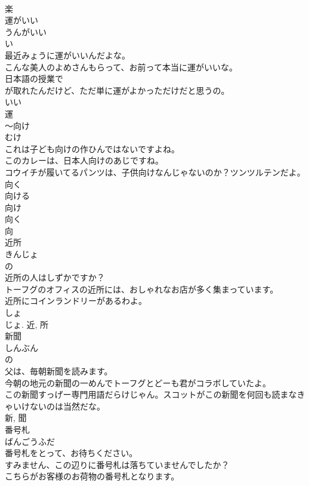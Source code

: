 \documentclass[8pt]{extreport}
\begin{document}
\begin{CJK}{UTF8}{min}
\\	楽	
\\	運がいい	
\\	うんがいい	
\\	い 
\\	最近みょうに運がいいんだよな。	
\\	こんな美人のよめさんもらって、お前って本当に運がいいな。	
\\	日本語の授業で
\\	が取れたんだけど、ただ単に運がよかっただけだと思うの。	
\\	いい 
\\	運	
\\	〜向け	
\\	むけ	
\\	これは子ども向けの作ひんではないですよね。	
\\	このカレーは、日本人向けのあじですね。	
\\	コウイチが履いてるパンツは、子供向けなんじゃないのか？ツンツルテンだよ。	
\\	向く 
\\	向ける 
\\	向け 
\\	向く 
\\	向	
\\	近所	
\\	きんじょ	
\\	の 
\\	近所の人はしずかですか？	
\\	トーフグのオフィスの近所には、おしゃれなお店が多く集まっています。	
\\	近所にコインランドリーがあるわよ。	
\\	しょ 
\\	じょ.	近, 所	
\\	新聞	
\\	しんぶん	
\\	の 
\\	父は、毎朝新聞を読みます。	
\\	今朝の地元の新聞の一めんでトーフグとどーも君がコラボしていたよ。	
\\	この新聞すっげー専門用語だらけじゃん。スコットがこの新聞を何回も読まなきゃいけないのは当然だな。	
\\	新, 聞	
\\	番号札	
\\	ばんごうふだ	
\\	番号札をとって、お待ちください。	
\\	すみません、この辺りに番号札は落ちていませんでしたか？	
\\	こちらがお客様のお荷物の番号札となります。	

\end{CJK}
\end{document}
